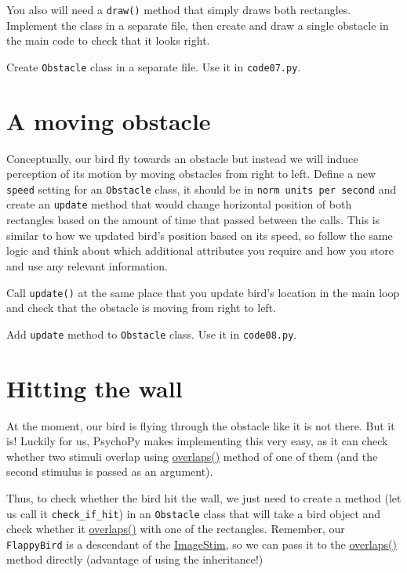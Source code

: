 \documentclass[
]{book}
\begin{document}
You also will need a \texttt{draw()} method that simply draws both rectangles. Implement the class in a separate file, then create and draw a single obstacle in the main code to check that it looks right.

Create \texttt{Obstacle} class in a separate file.
Use it in \texttt{code07.py}.

\hypertarget{a-moving-obstacle}{%
\section{A moving obstacle}\label{a-moving-obstacle}}

Conceptually, our bird fly towards an obstacle but instead we will induce perception of its motion by moving obstacles from right to left. Define a new \texttt{speed} setting for an \texttt{Obstacle} class, it should be in \texttt{norm\ units\ per\ second} and create an \texttt{update} method that would change horizontal position of both rectangles based on the amount of time that passed between the calls. This is similar to how we updated bird's position based on its speed, so follow the same logic and think about which additional attributes you require and how you store and use any relevant information.

Call \texttt{update()} at the same place that you update bird's location in the main loop and check that the obstacle is moving from right to left.

Add \texttt{update} method to \texttt{Obstacle} class.
Use it in \texttt{code08.py}.

\hypertarget{hitting-the-wall}{%
\section{Hitting the wall}\label{hitting-the-wall}}

At the moment, our bird is flying through the obstacle like it is not there. But it is! Luckily for us, PsychoPy makes implementing this very easy, as it can check whether two stimuli overlap using \href{https://psychopy.org/api/visual/shapestim.html\#psychopy.visual.ShapeStim.overlaps}{overlaps()} method of one of them (and the second stimulus is passed as an argument).

Thus, to check whether the bird hit the wall, we just need to create a method (let us call it \texttt{check\_if\_hit}) in an \texttt{Obstacle} class that will take a bird object and check whether it \href{https://psychopy.org/api/visual/shapestim.html\#psychopy.visual.ShapeStim.overlaps}{overlaps()} with one of the rectangles. Remember, our \texttt{FlappyBird} is a descendant of the \href{https://psychopy.org/api/visual/imagestim.html\#psychopy.visual.ImageStim}{ImageStim}, so we can pass it to the \href{https://psychopy.org/api/visual/shapestim.html\#psychopy.visual.ShapeStim.overlaps}{overlaps()} method directly (advantage of using the inheritance!)
\end{document}
